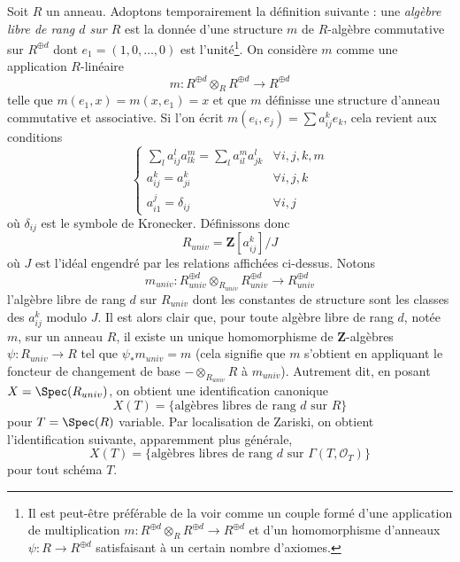 \medskip\noindent
Soit $R$ un anneau. Adoptons temporairement la définition suivante :
une {\it algèbre libre de rang $d$ sur $R$}
est la donnée d'une structure $m$ de $R$-algèbre commutative sur $R^{\oplus d}$
dont $e_1 = (1, 0, \ldots, 0)$ est l'unité\footnote{Il est peut-être préférable
de la voir comme un couple formé d'une application de multiplication
$m : R^{\oplus d} \otimes_R R^{\oplus d} \to R^{\oplus d}$ et
d'un homomorphisme d'anneaux $\psi : R \to R^{\oplus d}$ satisfaisant à un certain nombre d'axiomes.}.
On considère $m$ comme une application $R$-linéaire
$$
m : R^{\oplus d} \otimes_R R^{\oplus d} \longrightarrow R^{\oplus d}
$$
telle que $m(e_1, x) = m(x, e_1) = x$ et que $m$ définisse une
structure d'anneau commutative et associative. Si l'on écrit
$m(e_i, e_j) = \sum a_{ij}^ke_k$, cela revient
aux conditions
$$
\left\{
\begin{matrix}
\sum_l a_{ij}^la_{lk}^m = \sum_l a_{il}^ma_{jk}^l & \forall i, j, k, m \\
a_{ij}^k = a_{ji}^k & \forall i, j, k \\
a_{i1}^j = \delta_{ij} & \forall i, j
\end{matrix}
\right.
$$
où $\delta_{ij}$ est le symbole de Kronecker. Définissons donc
$$
R_{univ} = \mathbf{Z}[a_{ij}^k]/J
$$
où $J$ est l'idéal engendré par les relations affichées ci-dessus.
Notons
$$
m_{univ} :
R_{univ}^{\oplus d} \otimes_{R_{univ}} R_{univ}^{\oplus d}
\longrightarrow
R_{univ}^{\oplus d}
$$
l'algèbre libre de rang $d$ sur $R_{univ}$ dont les constantes
de structure sont les classes des $a_{ij}^k$ modulo $J$.
Il est alors clair que, pour toute algèbre libre de rang $d$, notée $m$, sur un anneau
$R$, il existe un unique homomorphisme de $\mathbf{Z}$-algèbres
$\psi : R_{univ} \to R$ tel que $\psi_*m_{univ} = m$ (cela signifie que
$m$ s'obtient en appliquant le foncteur de changement de base
$- \otimes_{R_{univ}} R$ à $m_{univ}$). Autrement dit, en posant
$X = \Spec(R_{univ})$, on obtient une identification canonique
$$
X(T) = \{\text{algèbres libres de rang }d\text{ sur }R\}
$$
pour $T = \Spec(R)$ variable. Par localisation de Zariski, on obtient
l'identification suivante, apparemment plus générale,
\begin{equation}
\label{equation-objects}
X(T) = \{\text{algèbres libres de rang }d
\text{ sur }\Gamma(T, \mathcal{O}_T)\}
\end{equation}
pour tout schéma $T$.

